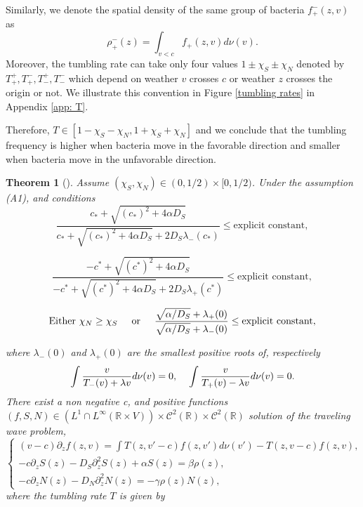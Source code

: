 \documentclass[11pt,twoside]{article}
\numberwithin{equation}{section}
\theoremstyle{plain}
\newtheorem{theorem}{Theorem}[section]
\theoremstyle{nonumberplain}
\begin{document}
{Similarly, we denote the spatial density of the same group of bacteria $f^-_+(z,v)$ as 
\[
    \rho^-_+(z) = \int_{v<c} f_+(z,v)d\nu(v).
\]
Moreover, the tumbling rate can take only four values $1\pm\chi_S\pm\chi_N$ denoted by $T^+_+, T^-_+, T^+_-, T^-_-$ which depend on weather $v$ crosses $c$ or weather $z$ crosses the origin or not. We illustrate this convention in Figure \ref{tumbling rates} in Appendix \ref{app: T}.




Therefore, $T\in[1-\chi_S-\chi_N, 1+\chi_S+\chi_N]$ and we conclude that the tumbling frequency is higher when bacteria move in the favorable direction and smaller when bacteria move in the unfavorable direction.

\begin{theorem}[\cite{calvez2019chemotactic}] \label{theorem_existence_mesos}
 Assume $(\chi_S, \chi_N) \in (0, 1/2) \times [0, 1/2)$. Under the assumption (A1), and conditions 
\begin{equation} 
    \frac{c_* + \sqrt{(c_*)^2 + 4 \alpha D_S}}{c_* + \sqrt{(c_*)^2 + 4 \alpha D_S} + 2D_S \lambda_-(c_*)} \le \text{explicit constant},
    \label{constraint1}
\end{equation}

\begin{equation}
    \frac{-c^* + \sqrt{(c^*)^2 + 4 \alpha D_S}}{-c^* + \sqrt{(c^*)^2 + 4 \alpha D_S} + 2D_S \lambda_+(c^*)} \le \text{explicit constant},
    \label{constraint2}
\end{equation}

\begin{equation}
    \text{Either } \chi_N \ge \chi_S \hspace{0.5cm} \text{or} \hspace{0.5cm} \frac{\sqrt{\alpha / D_S} + \lambda_+ (0)}{\sqrt{\alpha / D_S} + \lambda_- (0)} \le \text{explicit constant},
    \label{constraint3}
\end{equation}

where $\lambda_-(0)$ and $\lambda_+(0)$
 are the smallest positive roots of, respectively 
 \begin{equation}
     \int \frac{v}{T_-(v) + \lambda v} d\nu (v) = 0, \hspace{0.4cm} \int \frac{v}{T_+(v) - \lambda v} d \nu (v) = 0.
     \nonumber
 \end{equation}
 There exist a non negative c, and positive functions $(f, S, N) \in (L^1 \cap L^\infty (\mathbb{R} \times V)) \times \mathcal{C}^2(\mathbb{R}) \times \mathcal{C}^2 (\mathbb{R})$ solution of the traveling wave problem,
 \begin{equation}
         \left \{
    \begin{aligned}
       (v-c) \partial_z f(z,v) = \int T(z, v'-c)f(z,v') d\nu (v') - T(z, v-c)f(z,v),\\
       -c \partial_z S(z) - D_S \partial_z^2 S(z) + \alpha S(z) = \beta \rho (z),\\
       -c \partial_z N(z) - D_N \partial_z^2 N(z) = - \gamma \rho (z) N(z),
    \end{aligned}
  \right .
  \label{eq_sys_mesoscopic}
\end{equation}
where the tumbling rate $T$ is given by 


\end{theorem}}
\end{document}
